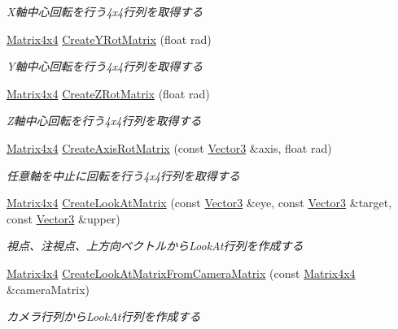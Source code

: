 \begin{DoxyCompactItemize}
\begin{DoxyCompactList}\small\item\em X軸中心回転を行う4x4行列を取得する \end{DoxyCompactList}\item 
\mbox{\hyperlink{struct_math_1_1_matrix4x4}{Matrix4x4}} \mbox{\hyperlink{namespace_math_a82079192513df361d5828e6a8c8754f3}{Create\+Y\+Rot\+Matrix}} (float rad)
\begin{DoxyCompactList}\small\item\em Y軸中心回転を行う4x4行列を取得する \end{DoxyCompactList}\item 
\mbox{\hyperlink{struct_math_1_1_matrix4x4}{Matrix4x4}} \mbox{\hyperlink{namespace_math_a359a2e7263fd64b49264e158052107ab}{Create\+Z\+Rot\+Matrix}} (float rad)
\begin{DoxyCompactList}\small\item\em Z軸中心回転を行う4x4行列を取得する \end{DoxyCompactList}\item 
\mbox{\hyperlink{struct_math_1_1_matrix4x4}{Matrix4x4}} \mbox{\hyperlink{namespace_math_ade59dd308fe183bc0c185f8d1c6d7074}{Create\+Axis\+Rot\+Matrix}} (const \mbox{\hyperlink{struct_math_1_1_vector3}{Vector3}} \&axis, float rad)
\begin{DoxyCompactList}\small\item\em 任意軸を中止に回転を行う4x4行列を取得する \end{DoxyCompactList}\item 
\mbox{\hyperlink{struct_math_1_1_matrix4x4}{Matrix4x4}} \mbox{\hyperlink{namespace_math_a33f8e9946f11a9efd4592ff441549a64}{Create\+Look\+At\+Matrix}} (const \mbox{\hyperlink{struct_math_1_1_vector3}{Vector3}} \&eye, const \mbox{\hyperlink{struct_math_1_1_vector3}{Vector3}} \&target, const \mbox{\hyperlink{struct_math_1_1_vector3}{Vector3}} \&upper)
\begin{DoxyCompactList}\small\item\em 視点、注視点、上方向ベクトルから\+Look\+At行列を作成する \end{DoxyCompactList}\item 
\mbox{\hyperlink{struct_math_1_1_matrix4x4}{Matrix4x4}} \mbox{\hyperlink{namespace_math_a902772771ec476f8ba2563babfcd865f}{Create\+Look\+At\+Matrix\+From\+Camera\+Matrix}} (const \mbox{\hyperlink{struct_math_1_1_matrix4x4}{Matrix4x4}} \&camera\+Matrix)
\begin{DoxyCompactList}\small\item\em カメラ行列から\+Look\+At行列を作成する \end{DoxyCompactList}\item 

\end{DoxyCompactItemize}
